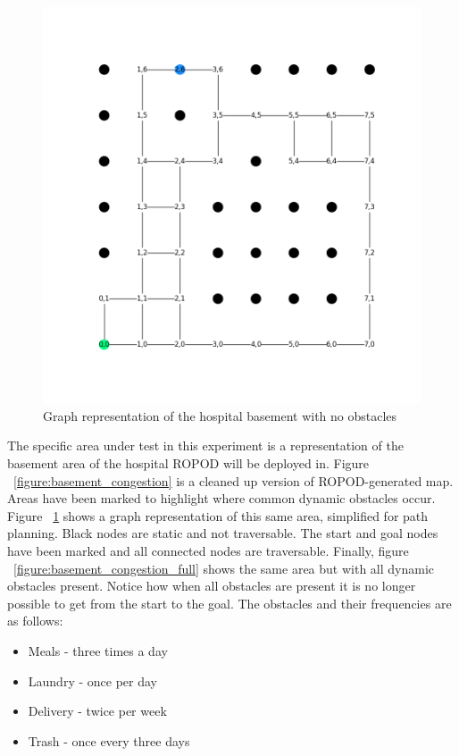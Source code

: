   \begin{figure}[!htb]
    \centering
    \includegraphics[width=\linewidth]{images/results/Empty_Hospital.png}
    \caption{Graph representation of the hospital basement with no obstacles}
    \label{figure:basement_congestion_empty}
  \end{figure}

  The specific area under test in this experiment is a representation
  of the basement area of the hospital ROPOD will be deployed in. Figure
  ~\ref{figure:basement_congestion}
  is a cleaned up version of ROPOD-generated map. Areas have been marked
  to highlight where common dynamic obstacles occur. Figure
  ~\ref{figure:basement_congestion_empty} shows a graph
  representation of this same area, simplified for path planning. Black nodes
  are static and not traversable. The start and goal nodes have been marked
  and all connected nodes are traversable. Finally,
  figure ~\ref{figure:basement_congestion_full}
  shows the same area but with all dynamic obstacles present. Notice how when
  all obstacles are present it is no longer possible to get from the start
  to the goal. The obstacles
  and their frequencies are as follows: \\

  \begin{itemize}

    \item Meals - three times a day

    \item Laundry - once per day

    \item Delivery - twice per week

    \item Trash - once every three days

  \end{itemize}

